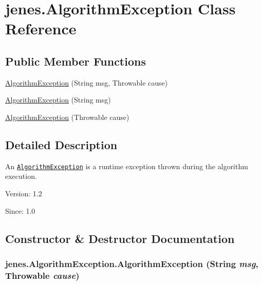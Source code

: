\hypertarget{classjenes_1_1_algorithm_exception}{
\section{jenes.AlgorithmException Class Reference}
\label{classjenes_1_1_algorithm_exception}
}
\subsection*{Public Member Functions}
\begin{CompactItemize}
\item 
\hyperlink{classjenes_1_1_algorithm_exception_a53d271c0db7099eb6fc52c288e05eb0}{AlgorithmException} (String msg, Throwable cause)
\item 
\hyperlink{classjenes_1_1_algorithm_exception_295c243603f7b36f9ab5b0e1ec22aa60}{AlgorithmException} (String msg)
\item 
\hyperlink{classjenes_1_1_algorithm_exception_d6906756121d65db53ece1c1d9d8d0db}{AlgorithmException} (Throwable cause)
\end{CompactItemize}


\subsection{Detailed Description}
An {\tt \hyperlink{classjenes_1_1_algorithm_exception}{AlgorithmException}} is a runtime exception thrown during the algorithm execution.

\begin{Desc}
\item[Version:]1.2 \end{Desc}
\begin{Desc}
\item[Since:]1.0 \end{Desc}


\subsection{Constructor \& Destructor Documentation}
\hypertarget{classjenes_1_1_algorithm_exception_a53d271c0db7099eb6fc52c288e05eb0}{
\subsubsection[AlgorithmException]{\setlength{\rightskip}{0pt plus 5cm}jenes.AlgorithmException.AlgorithmException (String {\em msg}, \/  Throwable {\em cause})}}
\label{classjenes_1_1_algorithm_exception_a53d271c0db7099eb6fc52c288e05eb0}


